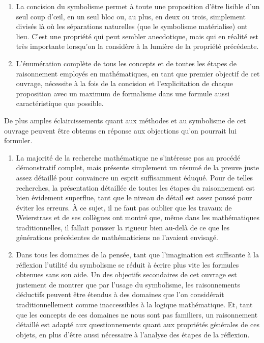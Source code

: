 \documentclass[a4paper]{book}
\begin{document}
\begin{enumerate}
\item La concision du symbolisme permet à toute une proposition d'être lisible d'un seul coup d'\oe il, en un seul bloc ou, au plus, en deux ou trois, simplement divisés là où les séparations naturelles (que le symbolisme matérialise) ont lieu. C'est une propriété qui peut sembler anecdotique, mais qui en réalité est très importante lorsqu'on la considère à la lumière de la propriété précédente.
\item L'énumération complète de tous les concepts et de toutes les étapes de raisonnement employés en mathématiques, en tant que premier objectif de cet ouvrage, nécessite à la fois de la concision et l'explicitation de chaque proposition avec un maximum de formalisme dans une formule aussi caractéristique que possible.

\end{enumerate}

De plus amples éclaircissements quant aux méthodes et au symbolisme de cet ouvrage peuvent être obtenus en réponse aux objections qu'on pourrait lui formuler.

\begin{enumerate}
\item La majorité de la recherche mathématique ne s'intéresse pas au procédé démonstratif complet, mais présente simplement un résumé de la preuve juste assez détaillé pour convaincre un esprit suffisamment éduqué. Pour de telles recherches, la présentation détaillée de toutes les étapes du raisonnement est bien évidement superflue, tant que le niveau de détail est assez poussé pour éviter les erreurs. À ce sujet, il ne faut pas oublier que les travaux de Weierstrass et de ses collègues ont montré que, même dans les mathématiques traditionnelles, il fallait pousser la rigueur bien au-delà de ce que les générations précédentes de mathématiciens ne l'avaient envisagé.
\item Dans tous les domaines de la pensée, tant que l'imagination est suffisante à la réflexion l'utilité du symbolisme se réduit à écrire plus vite les formules obtenues sans son aide. Un des objectifs secondaires de cet ouvrage est justement de montrer que par l'usage du symbolisme, les raisonnements déductifs peuvent être étendus à des domaines que l'on considérait traditionnellement comme inaccessibles à la logique mathématique. Et, tant que les concepts de ces domaines ne nous sont pas familiers, un raisonnement détaillé est adapté aux questionnements quant aux propriétés générales de ces objets, en plus d'être aussi nécessaire à l'analyse des étapes de la réflexion.
\end{enumerate}
\end{document}
